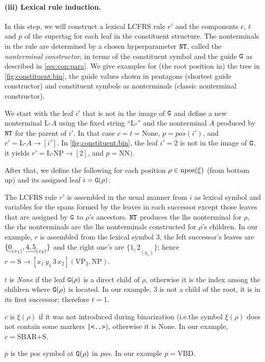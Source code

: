 \documentclass[../../document.tex]{subfiles}
\begin{document}
    \paragraph{(iii) Lexical rule induction.}
    In this step, we will construct a lexical LCFRS rule \(r'\) and the components \(c\), \(t\) and \(p\) of the supertag for each leaf in the constituent structure.
    The nonterminals in the rule are determined by a chosen hyperparameter \(\texttt{NT}\), called the \emph{nonterminal constructor}, in terms of the constituent symbol and the guide \(\texttt{G}\) as described in \cref{sec:con:para}.
    We give examples for (the root position in) the tree in \cref{fig:constituent:bin}, the guide values shown in pentagons (shortest guide constructor) and constituent symbols as nonterminals (classic nonterminal constructor).

    We start with the leaf \(i'\) that is not in the image of \(\texttt{G}\) and define a new nonterminal \(\text{L-}A\) using the fixed string ``L-'' and the nonterminal \(A\) produced by \(\texttt{NT}\) for the parent of \(i'\).
    In that case \(c = t = \text{None}\), \(p = \mathit{pos}(i')\), and \(r' = \text{L-}A \to [i']\).
    In \cref{fig:constituent:bin}, the leaf \(i'=2\) is not in the image of \(\texttt{G}\), it yields \(r' = \text{L-NP} \to [2]\), and \(p = \text{NN})\).

    After that, we define the following for each position \(\rho \in \operatorname{npos}(\xi)\) (from bottom up) and its assigned leaf \(i = \texttt{G}(\rho)\):
    \begin{asparaitem}
        \item
        The LCFRS rule \(r'\) is assembled in the usual manner from \(i\) as lexical symbol and variables for the spans formed by the leaves in each successor except those leaves that are assigned by \(\texttt{G}\) to \(\rho\)'s ancestors.
        \(\texttt{NT}\) produces the lhs nonterminal for \(\rho\), the rhs nonterminals are the lhs nonterminals constructed for \(\rho\)'s children.
        In our example, \(r\) is assembled from the lexical symbol \(3\), the left successor's leaves are \(\{\underline{0\vphantom{,}}_{(x_1)}, \underline{4,5} _{(x_2)}\}\) and the right one's are \(\{\underline{1,2} _{(y_1)}\}\);
        hence \(r = \text{S} \to [x_1 \, y_1 \, 3 \, x_2] (\text{VP}_2, \text{NP})\).

        \item
        \(t\) is \emph{None} if the leaf \(\texttt{G}(\rho)\) is a direct child of \(\rho\), otherwise it is the index among the children where \(\texttt{G}(\rho)\) is located.
        In our example, 3 is not a child of the root, it is in its first successor; therefore \(t=1\).

        \item
        \(c\) is \(\xi(\rho)\) if it was not introduced during binarization (i.e.\@ the symbol \(\xi(\rho)\) does not contain some markers \texttt{|<..>}), otherwise it is None.
        In our example, \(c = \text{SBAR+S}\).

        \item
        \(p\) is the pos symbol at \(\texttt{G}(\rho)\) in \(\mathit{pos}\).
        In our example \(p = \text{VBD}\).
    \end{asparaitem}
\end{document}
